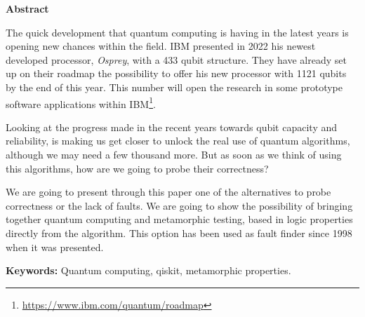 \newpage

\thispagestyle{empty}

\begin{center}

{\bf \Huge Abstract}

  \end{center}
\vspace{1cm}

The quick development that quantum computing is having in the latest years is opening new chances within the field. IBM presented in 2022 his newest developed processor, \textit{Osprey}, with a 433 qubit structure. They have already set up on their roadmap the possibility to offer his new processor with 1121 qubits by the end of this year. This number will open the research in some prototype software applications within IBM\footnote{\url{https://www.ibm.com/quantum/roadmap}}.\newline

Looking at the progress made in the recent years towards qubit capacity and reliability, is making us get closer to unlock the real use of quantum algorithms, although we may need a few thousand more. But as soon as we think of using this algorithms, how are we going to probe their correctness?\newline

We are going to present through this paper one of the alternatives to probe correctness or the lack of faults. We are going to show the possibility of bringing together quantum computing and metamorphic testing, based in logic properties directly from the algorithm. This option has been used as fault finder since 1998 when it was presented.

\vspace{1cm}

\textbf{Keywords:} Quantum computing, qiskit, metamorphic properties.